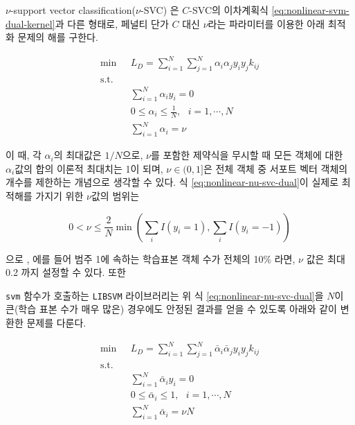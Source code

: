 \documentclass[
]{book}
\begin{document}
\(\nu\)-support vector classification(\(\nu\)-SVC) \citep[\citet{chang2001training}]{scholkopf2000new}은 \(C\)-SVC의 이차계획식 \eqref{eq:nonlinear-svm-dual-kernel}과 다른 형태로, 페널티 단가 \(C\) 대신 \(\nu\)라는 파라미터를 이용한 아래 최적화 문제의 해를 구한다.

\begin{equation}
\begin{split}
\min \text{  } & L_D = \sum_{i = 1}^{N} \sum_{j = 1}^{N} \alpha_i \alpha_j y_i y_j k_{ij}\\
\text{s.t. } &\\
& \sum_{i = 1}^{N} \alpha_i y_i = 0\\
& 0 \le \alpha_i \le \frac{1}{N}, \text{  } i = 1, \cdots, N\\
& \sum_{i = 1}^{N} \alpha_i = \nu
\end{split}
\label{eq:nonlinear-nu-svc-dual}
\end{equation}

이 때, 각 \(\alpha_i\)의 최대값은 \(1/N\)으로, \(\nu\)를 포함한 제약식을 무시할 때 모든 객체에 대한 \(\alpha_i\)값의 합의 이론적 최대치는 1이 되며, \(\nu \in (0, 1]\)은 전체 객체 중 서포트 벡터 객체의 개수를 제한하는 개념으로 생각할 수 있다. 식 \eqref{eq:nonlinear-nu-svc-dual}이 실제로 최적해를 가지기 위한 \(\nu\)값의 범위는

\begin{equation*}
0 < \nu \le \frac{2}{N} \min \left( \sum_i I(y_i = 1), \sum_i I(y_i = -1) \right)
\end{equation*}

으로 \citep{chang2001training}, 에를 들어 범주 1에 속하는 학습표본 객체 수가
전체의 10\% 라면, \(\nu\) 값은 최대 0.2 까지 설정할 수 있다. 또한

\texttt{svm} 함수가 호출하는 \texttt{LIBSVM} 라이브러리는 위 식 \eqref{eq:nonlinear-nu-svc-dual}을 \(N\)이 큰(학습 표본 수가 매우 많은) 경우에도 안정된 결과를 얻을 수 있도록 아래와 같이 변환한 문제를 다룬다.

\begin{equation}
\begin{split}
\min \text{  } & L_D = \sum_{i = 1}^{N} \sum_{j = 1}^{N} \bar{\alpha}_i \bar{\alpha}_j y_i y_j k_{ij}\\
\text{s.t. } &\\
& \sum_{i = 1}^{N} \bar{\alpha}_i y_i = 0\\
& 0 \le \bar{\alpha}_i \le 1, \text{  } i = 1, \cdots, N\\
& \sum_{i = 1}^{N} \bar{\alpha}_i = \nu N
\end{split}
\label{eq:libsvm-nu-svc-dual}
\end{equation}
\end{document}
